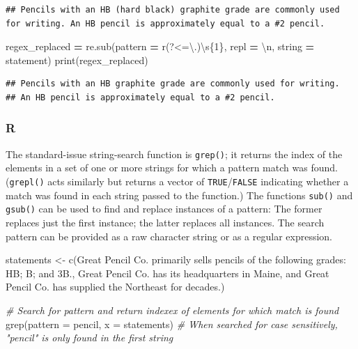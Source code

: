 \documentclass[
]{book}
\newenvironment{Shaded}{\begin{snugshade}}{\end{snugshade}}
\newcommand{\AttributeTok}[1]{\textcolor[rgb]{0.77,0.63,0.00}{#1}}
\newcommand{\BuiltInTok}[1]{#1}
\newcommand{\CharTok}[1]{\textcolor[rgb]{0.31,0.60,0.02}{#1}}
\newcommand{\CommentTok}[1]{\textcolor[rgb]{0.56,0.35,0.01}{\textit{#1}}}
\newcommand{\FunctionTok}[1]{\textcolor[rgb]{0.00,0.00,0.00}{#1}}
\newcommand{\NormalTok}[1]{#1}
\newcommand{\OperatorTok}[1]{\textcolor[rgb]{0.81,0.36,0.00}{\textbf{#1}}}
\newcommand{\OtherTok}[1]{\textcolor[rgb]{0.56,0.35,0.01}{#1}}
\newcommand{\SpecialCharTok}[1]{\textcolor[rgb]{0.00,0.00,0.00}{#1}}
\newcommand{\StringTok}[1]{\textcolor[rgb]{0.31,0.60,0.02}{#1}}
\newcommand{\VerbatimStringTok}[1]{\textcolor[rgb]{0.31,0.60,0.02}{#1}}
\begin{document}
\begin{verbatim}
## Pencils with an HB (hard black) graphite grade are commonly used for writing. An HB pencil is approximately equal to a #2 pencil.
\end{verbatim}

\begin{Shaded}
\begin{Highlighting}[]
\NormalTok{regex\_replaced }\OperatorTok{=}\NormalTok{ re.sub(pattern }\OperatorTok{=} \VerbatimStringTok{r\textquotesingle{}(?\textless{}=\textbackslash{}.)\textbackslash{}s}\SpecialCharTok{\{1\}}\VerbatimStringTok{\textquotesingle{}}\NormalTok{, repl }\OperatorTok{=} \StringTok{\textquotesingle{}}\CharTok{\textbackslash{}n}\StringTok{\textquotesingle{}}\NormalTok{, string }\OperatorTok{=}\NormalTok{ statement)}
\BuiltInTok{print}\NormalTok{(regex\_replaced)}
\end{Highlighting}
\end{Shaded}

\begin{verbatim}
## Pencils with an HB graphite grade are commonly used for writing.
## An HB pencil is approximately equal to a #2 pencil.
\end{verbatim}

\hypertarget{r-25}{%
\subsubsection*{R}\label{r-25}}

The standard-issue string-search function is \texttt{grep()}; it returns the index of the elements in a set of one or more strings for which a pattern match was found. (\texttt{grepl()} acts similarly but returns a vector of \texttt{TRUE}/\texttt{FALSE} indicating whether a match was found in each string passed to the function.) The functions \texttt{sub()} and \texttt{gsub()} can be used to find and replace instances of a pattern: The former replaces just the first instance; the latter replaces all instances. The search pattern can be provided as a raw character string or as a regular expression.

\begin{Shaded}
\begin{Highlighting}[]
\NormalTok{statements }\OtherTok{\textless{}{-}} \FunctionTok{c}\NormalTok{(}\StringTok{\textquotesingle{}Great Pencil Co. primarily sells pencils of the following grades: HB; B; and 3B.\textquotesingle{}}\NormalTok{,}
                \StringTok{\textquotesingle{}Great Pencil Co. has its headquarters in Maine, and Great Pencil Co. has supplied the Northeast for decades.\textquotesingle{}}\NormalTok{)}

\CommentTok{\# Search for pattern and return indexex of elements for which match is found}
\FunctionTok{grep}\NormalTok{(}\AttributeTok{pattern =} \StringTok{\textquotesingle{}pencil\textquotesingle{}}\NormalTok{, }\AttributeTok{x =}\NormalTok{ statements) }\CommentTok{\# When searched for case sensitively, "pencil" is only found in the first string}
\end{Highlighting}
\end{Shaded}
\end{document}
